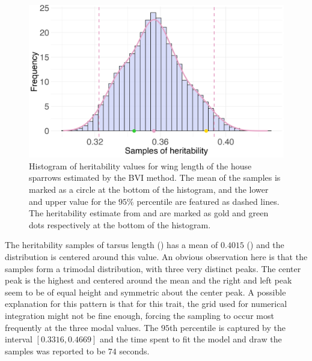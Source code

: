 \begin{figure}[H]%
  \centering
  \includegraphics[width=1\linewidth]{Figures/House sparrow study/Heritability_wing.png}
  \caption{Histogram of heritability values for wing length of the house sparrows estimated by the BVI method. The mean of the samples is marked as a circle at the bottom of the histogram, and the lower and upper value for the $95\%$ percentile are featured as dashed lines. The heritability estimate from \citet{Silva2017} and \citet{Muff2019Genetic} are marked as gold and green dots respectively at the bottom of the histogram.}
  \label{fig:heritability_wing}
\end{figure}
\noindent The heritability samples of tarsus length () has a mean of $0.4015$ () and the distribution is centered around this value. An obvious observation here is that the samples form a trimodal distribution, with three very distinct peaks. The center peak is the highest and centered around the mean and the right and left peak seem to be of equal height and symmetric about the center peak. A possible explanation for this pattern is that for this trait, the grid used for numerical integration might not be fine enough, forcing the sampling to occur most frequently at the three modal values. The $95$th percentile is captured by the interval $[0.3316, 0.4669]$ and the time spent to fit the model and draw the samples was reported to be $74$ seconds.  
